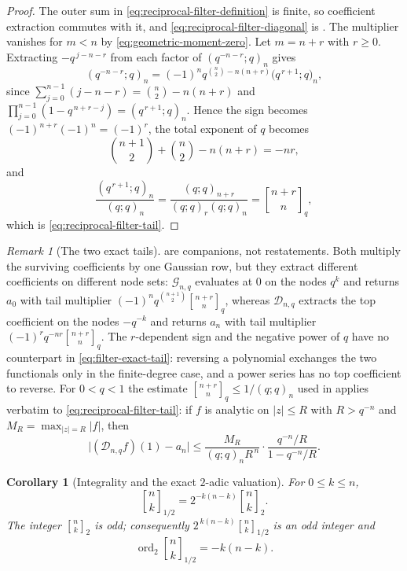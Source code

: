 \documentclass[11pt,oneside,openany]{book}
\newtheorem{corollary}[corollary]{Corollary}
\theoremstyle{definition}
\theoremstyle{remark}
\newtheorem{remark}[remark]{Remark}
\newcommand{\Qbinom}[3]{\genfrac{[}{]}{0pt}{}{#1}{#2}_{#3}}
\newcommand{\ord}{\operatorname{ord}}
\newcommand{\abs}[1]{\lvert #1\rvert}
\begin{document}
\begin{proof}
The outer sum in \eqref{eq:reciprocal-filter-definition} is finite, so coefficient extraction commutes with it, and \eqref{eq:reciprocal-filter-diagonal} is .  The multiplier vanishes for $m<n$ by \eqref{eq:geometric-moment-zero}.  Let $m=n+r$ with $r\ge0$.  Extracting $-q^{\,j-n-r}$ from each factor of $(q^{-n-r};q)_n$ gives
\[
 (q^{-n-r};q)_n
 =(-1)^nq^{\binom n2-n(n+r)}\bigl(q^{\,r+1};q\bigr)_n,
\]
since $\sum_{j=0}^{n-1}(j-n-r)=\binom n2-n(n+r)$ and $\prod_{j=0}^{n-1}(1-q^{\,n+r-j})=(q^{\,r+1};q)_n$.  Hence the sign becomes $(-1)^{n+r}(-1)^n=(-1)^r$, the total exponent of $q$ becomes
\[
 \binom{n+1}{2}+\binom n2-n(n+r)=-nr,
\]
and
\[
 \frac{(q^{\,r+1};q)_n}{(q;q)_n}
 =\frac{(q;q)_{n+r}}{(q;q)_r(q;q)_n}
 =\Qbinom{n+r}{n}{q},
\]
which is \eqref{eq:reciprocal-filter-tail}.
\end{proof}

\begin{remark}[The two exact tails]\label{rem:two-exact-tails}
 are companions, not restatements.  Both multiply the surviving coefficients by one Gaussian row, but they extract different coefficients on different node sets: $\mathcal G_{n,q}$ evaluates at $0$ on the nodes $q^k$ and returns $a_0$ with tail multiplier $(-1)^nq^{\binom{n+1}{2}}\Qbinom{n+r}{n}{q}$, whereas $\mathcal D_{n,q}$ extracts the top coefficient on the nodes $-q^{-k}$ and returns $a_n$ with tail multiplier $(-1)^rq^{-nr}\Qbinom{n+r}{n}{q}$.  The $r$-dependent sign and the negative power of $q$ have no counterpart in \eqref{eq:filter-exact-tail}: reversing a polynomial exchanges the two functionals only in the finite-degree case, and a power series has no top coefficient to reverse.  For $0<q<1$ the estimate $\Qbinom{n+r}{n}{q}\le1/(q;q)_n$ used in  applies verbatim to \eqref{eq:reciprocal-filter-tail}: if $f$ is analytic on $\abs z\le R$ with $R>q^{-n}$ and $M_R=\max_{\abs z=R}\abs{f}$, then
\[
 \abs{(\mathcal D_{n,q}f)(1)-a_n}
 \le\frac{M_R}{(q;q)_nR^{\,n}}\cdot
    \frac{q^{-n}/R}{1-q^{-n}/R}.
\]
\end{remark}

\begin{corollary}[Integrality and the exact $2$-adic valuation]\label{cor:halfbase-gaussian-valuation}
For $0\le k\le n$,
\begin{equation}\label{eq:halfbase-two-reciprocity}
 \Qbinom nk{1/2}=2^{-k(n-k)}\Qbinom nk2 .
\end{equation}
The integer $\Qbinom nk2$ is odd; consequently $2^{\,k(n-k)}\Qbinom nk{1/2}$ is an odd integer and
\begin{equation}\label{eq:halfbase-valuation}
 \ord_2\Qbinom nk{1/2}=-k(n-k).
\end{equation}
\end{corollary}
\end{document}

